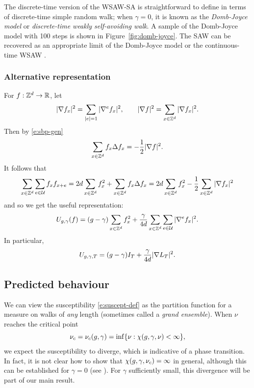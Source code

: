 \begin{rk}
The discrete-time version of the WSAW-SA is straightforward to define in terms of
discrete-time simple random walk; when
$\gamma = 0$, it is known as the \emph{Domb-Joyce model} or \emph{discrete-time
weakly self-avoiding walk}. A sample of the Domb-Joyce model with 100 steps is shown
in Figure~\ref{fig:domb-joyce}. The SAW can be recovered as an
appropriate limit of the Domb-Joyce model or the continuous-time WSAW \cite{BDS12}.
\end{rk}

\subsubsection{Alternative representation}

For $f : { {{\mathbb Z}}^d } \rightarrow {\mathbb R}$, let 
\begin{equation}
|\nabla f_x|^2 = \sum_{|e|=1} |\nabla^e f_x|^2,
	\qquad
|\nabla f|^2 = \sum_{x\in{ {{\mathbb Z}}^d }} |\nabla f_x|^2.
\end{equation}
Then by \eqref{e:sbp-gen}
\begin{equation}
\label{e:sbp}
\sum_{x\in{ {{\mathbb Z}}^d }} f_x \Delta f_x
	=
-\frac{1}{2} |\nabla f|^2.
\end{equation}
It follows that
\begin{equation}
\sum_{x\in{ {{\mathbb Z}}^d }} \sum_{e\in\mathcal{U}} f_x f_{x+e}
=
2 d \sum_{x\in{ {{\mathbb Z}}^d }} f_x^2
+ \sum_{x\in{ {{\mathbb Z}}^d }} f_x \Delta f_x
=
2 d \sum_{x\in{ {{\mathbb Z}}^d }} f_x^2
- \frac{1}{2} \sum_{x\in{ {{\mathbb Z}}^d }} |\nabla f_x|^2
\end{equation}
and so we get the useful representation:
\begin{equation}
\label{e:Udef-pos}
U_{g,\gamma}(f)
= (g - \gamma) \sum_{x\in{ {{\mathbb Z}}^d }} f_x^2
+ \frac{\gamma}{4d} \sum_{x\in{ {{\mathbb Z}}^d }} \sum_{e\in\mathcal{U}} |\nabla^e f_x|^2.
\end{equation}
In particular,
\begin{equation}
  \label{e:V2}
  U_{g,\gamma,T} =
  (g - \gamma) I_T
  + \frac{\gamma}{4d}
  |\nabla L_T|^2
  .
\end{equation}


\subsection{Predicted behaviour}

We can view the susceptibility \eqref{e:suscept-def} as the partition function
for a measure on walks of \emph{any} length (sometimes called a \emph{grand
ensemble}). When $\nu$ reaches the critical point
\begin{equation}
\nu_c = \nu_c(g, \gamma) = \inf\{ \nu : \chi(g,\gamma,\nu) < \infty \},
\end{equation}
we expect the susceptibility to diverge, which is indicative of a phase transition.
In fact, it is not clear how to show that $\chi(g,\gamma,\nu_c) = \infty$ in
general, although this can be established for $\gamma = 0$
(see \cite[Lemma~\ref{log-lem:csub}]{BBS-saw4-log}). For $\gamma$
sufficiently small, this divergence will be part of our main result.


